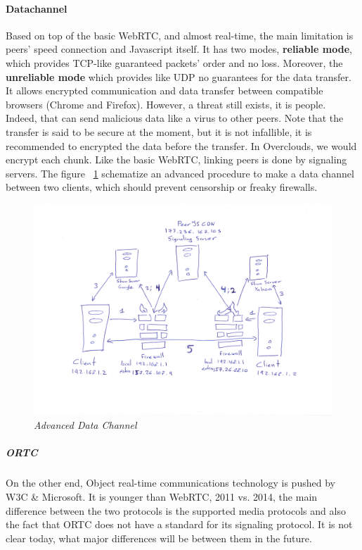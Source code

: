 \paragraph{Datachannel\cite{R.Stewart2007StreamProtocol}} Based on top of the basic WebRTC, and almost real-time,  the main limitation is peers' speed connection and Javascript itself. It has two modes, \textbf{reliable mode}, which provides TCP-like guaranteed packets' order and no loss. Moreover, the \textbf{unreliable mode} which provides like UDP no guarantees for the data transfer. It allows encrypted communication and data transfer between compatible browsers (Chrome and Firefox). However, a threat still exists, it is people. Indeed, that can send malicious data like a virus to other peers. Note that the transfer is said to be secure at the moment, but it is not infallible, it is recommended to encrypted the data before the transfer. In Overclouds, we would encrypt each chunk. Like the basic WebRTC, linking peers is done by signaling servers.
The figure ~\ref{fig:signaling-advanced} schematize an advanced procedure to make a data channel between two clients, which should prevent censorship or freaky firewalls.
\begin{figure}[htpb]
\centering
\caption{\small \sl Advanced Data Channel
\label{fig:signaling-advanced}}
\begin{adjustbox}{center}
\includegraphics[scale=0.1]{annexes/schemes/signaling-advanced.jpg}
\end{adjustbox}
\end{figure} 
\clearpage

\subparagraph{ORTC} On the other end, Object real-time communications technology is pushed by W3C \& Microsoft. It is younger than WebRTC, 2011 vs. 2014, the main difference\cite{Sinch2015ORTCDIFFERENCE} between the two protocols is the supported media protocols and also the fact that ORTC does not have a standard for its signaling protocol. It is not clear today, what major differences will be between them in the future.

